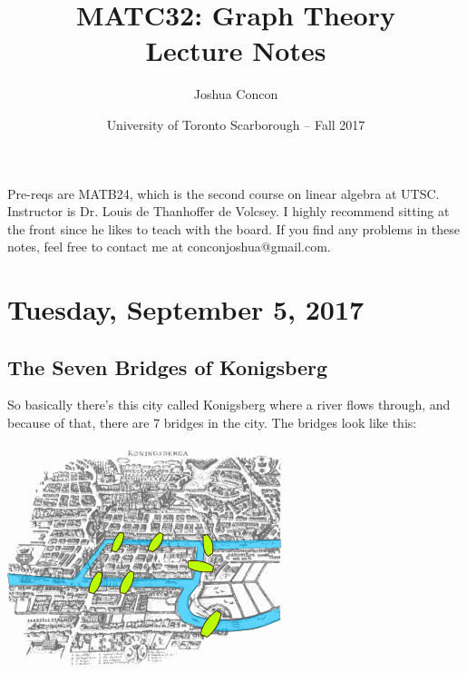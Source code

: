 \documentclass[12pt]{article}
\begin{document}
\title{MATC32: Graph Theory\\ Lecture Notes}
\date{University of Toronto Scarborough -- Fall 2017}
\author{Joshua Concon}
\maketitle
Pre-reqs are MATB24, which is the second course on linear algebra at UTSC.
Instructor is Dr. Louis de Thanhoffer de Volcsey. I highly recommend sitting at the front since he likes to teach with the board. If you find any problems in these notes, feel free to contact me at conconjoshua@gmail.com.

\tableofcontents

\pagebreak

\section{Tuesday, September 5, 2017}

\subsection{The Seven Bridges of Konigsberg}

So basically there's this city called Konigsberg where a river flows through, and because of that, there are 7 bridges in the city. The bridges look like this:\\
\\
\includegraphics{Konigsberg_bridges}\\
\\
\end{document}
